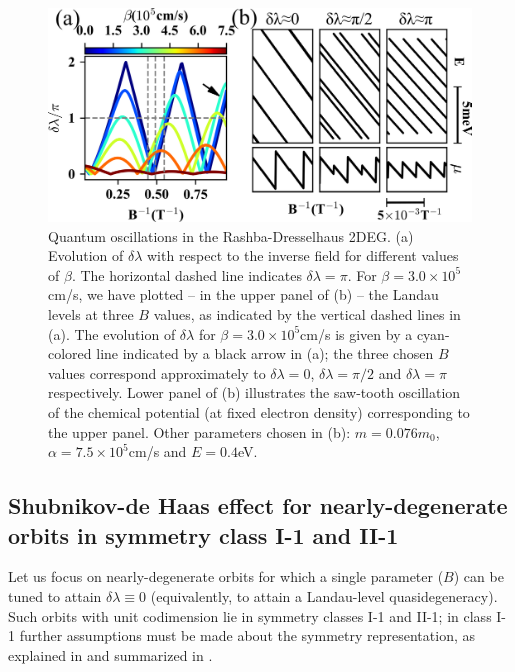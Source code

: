 \documentclass[aps, showpacs, twocolumn, notitlepage, superscriptaddress]{revtex4-1}
\begin{document}
\begin{figure}
\includegraphics[width=1.0\columnwidth]{qo.png}
\caption{Quantum oscillations in the Rashba-Dresselhaus 2DEG. (a) Evolution of $\delta\lambda$ with respect to the inverse field for different values of $\beta$. The horizontal dashed line indicates $\delta\lambda=\pi$. For $\beta=3.0\times 10^{5}$cm/s, we have plotted -- in the upper panel of (b) -- the Landau levels at three $B$ values, as indicated by the vertical dashed lines in (a). The evolution of $\delta \lambda$ for $\beta=3.0\times 10^{5}$cm/s is given by a cyan-colored line indicated by a black arrow in (a); the three chosen $B$ values correspond approximately to  $\delta\lambda{=}0$, $\delta\lambda{=}\pi/2$ and $\delta\lambda{=}\pi$ respectively. Lower panel of (b) illustrates the saw-tooth oscillation of the chemical potential (at fixed electron density) corresponding to the upper panel. Other parameters chosen in (b): $m{=}0.076m_0$, $\alpha{=}7.5\times10^{5}$cm/s and $E=0.4$eV.
\label{fig:qo}}
\end{figure}

\subsection{Shubnikov-de Haas effect for nearly-degenerate orbits in symmetry class I-1 and II-1}\label{sec:quantosc_quasideg}

Let us focus on nearly-degenerate orbits for which a single parameter ($B$) can be tuned to attain $\delta \lambda{\equiv}0$ (equivalently, to attain a Landau-level quasidegeneracy). Such orbits with unit codimension lie in symmetry classes I-1 and II-1; in class I-1 further assumptions must be made about the symmetry representation, as explained in  and summarized in .
\end{document}
